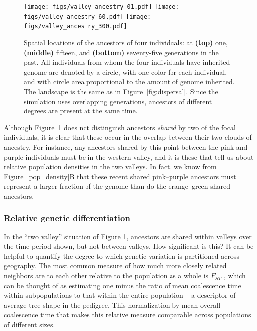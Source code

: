 \documentclass{ar-1col}
\begin{document}
\begin{figure}[H]
        \texttt{[image: figs/valley\_ancestry\_01.pdf]}
        \texttt{[image: figs/valley\_ancestry\_60.pdf]}
        \texttt{[image: figs/valley\_ancestry\_300.pdf]}
        \caption{
            Spatial locations of the ancestors of four individuals:
            at 
            \textbf{(top)} one, 
            \textbf{(middle)} fifteen, and
            \textbf{(bottom)} seventy-five generations in the past.
            All individuals from whom the four individuals have inherited genome are denoted by a circle,
            with one color for each individual,
            and with circle area proportional to the amount of genome inherited.
            The landscape is the same as in Figure~\ref{fig:dispersal}.
            Since the simulation uses overlapping generations,
            ancestors of different degrees are present at the same time.
        }
        \label{ancestry_spread}
\end{figure}

Although Figure~\ref{ancestry_spread} does not distinguish ancestors \textit{shared} by two of the focal individuals,
it is clear that these occur in the overlap between their two clouds of ancestry.
For instance, any ancestors shared by this point between the pink and purple individuals
must be in the western valley,
and it is these that tell us about relative population densities in the two valleys.
In fact, we know from Figure~\ref{pop_density}B that these recent shared pink--purple ancestors
must represent a larger fraction of the genome
than do the orange--green shared ancestors.


\subsubsection{Relative genetic differentiation}

In the ``two valley'' situation of Figure \ref{ancestry_spread},
ancestors are shared within valleys over the time period shown,
but not between valleys.
How significant is this?
It can be helpful to quantify the degree to which genetic variation is partitioned across geography.
The most common measure of
how much more closely related neighbors are to each other relative to the population as a whole
is $F_{ST}$ \citep{Wright1951},
which can be thought of as estimating
one minus the ratio of mean coalescence time within subpopulations
to that within the entire population \citep{slatkin_1991inbreeding}
-- a descriptor of average tree shape in the pedigree.
This normalization by mean overall coalescence time 
that makes this relative measure comparable across populations of different sizes.
\end{document}
